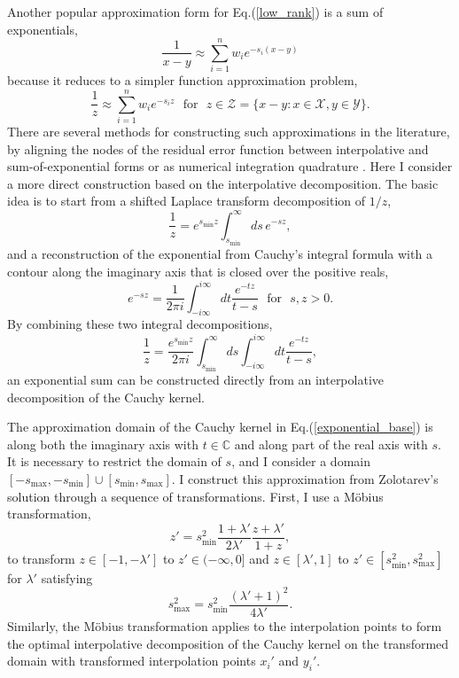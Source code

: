 \documentclass[12pt]{article}
\begin{document}
Another popular approximation form for Eq.\@ (\ref{low_rank}) is a sum of exponentials,
\begin{equation} \label{exponential_sum}
 \frac{1}{x-y} \approx \sum_{i=1}^n w_i e^{-s_i (x-y)}
\end{equation}
 because it reduces to a simpler function approximation problem,
\begin{equation} \label{exponential_sum2}
 \frac{1}{z} \approx \sum_{i=1}^n w_i e^{-s_i z} \ \ \ \mathrm{for} \ \ \ z \in \mathcal{Z} = \{ x - y : x \in \mathcal{X}, y \in \mathcal{Y} \}.
\end{equation}
There are several methods for constructing such approximations in the literature,
 by aligning the nodes of the residual error function between interpolative and sum-of-exponential forms \cite{10.1093/imanum/dri015}
 or as numerical integration quadrature \cite{BEYLKIN2010131}.
Here I consider a more direct construction based on the interpolative decomposition.
The basic idea is to start from a shifted Laplace transform decomposition of $1/z$,
\begin{equation}
 \frac{1}{z} = e^{s_{\min}z}\int_{s_{\min}}^{\infty} ds \, e^{-sz},
\end{equation}
 and a reconstruction of the exponential from Cauchy's integral formula with a contour along the imaginary axis that is closed over the positive reals,
\begin{equation}
 e^{-sz} = \frac{1}{2 \pi i} \int_{-i\infty}^{i\infty} dt \frac{e^{-tz}}{t - s} \ \ \ \mathrm{for} \ \ \ s, z >0.
\end{equation}
By combining these two integral decompositions,
\begin{equation} \label{exponential_base}
 \frac{1}{z} = \frac{e^{s_{\min}z}}{2 \pi i} \int_{s_{\min}}^{\infty} ds \int_{-i\infty}^{i\infty} dt \frac{e^{-tz}}{t - s},
\end{equation}
 an exponential sum can be constructed directly from an interpolative decomposition of the Cauchy kernel.

The approximation domain of the Cauchy kernel in Eq.\@ (\ref{exponential_base}) is along both the imaginary axis with $t \in \mathbb{C}$ and along part of the real axis with $s$.
It is necessary to restrict the domain of $s$, and I consider a domain $[-s_{\max}, -s_{\min}] \cup [s_{\min}, s_{\max}]$.
I construct this approximation from Zolotarev's solution through a sequence of transformations.
First, I use a M\"{o}bius transformation,
\begin{equation}
 z' = s_{\min}^2 \frac{1 + \lambda'}{2 \lambda'} \frac{z + \lambda'}{1+z},
\end{equation}
 to transform $z \in [-1, -\lambda']$ to $z' \in (-\infty,0]$ and $z \in [\lambda', 1]$ to $z' \in [s_{\min}^2, s_{\max}^2]$ for $\lambda'$ satisfying
\begin{equation}
 s_{\max}^2 = s_{\min}^2 \frac{(\lambda' +1)^2}{4 \lambda'}.
\end{equation}
Similarly, the M\"{o}bius transformation applies to the interpolation points to form the optimal interpolative decomposition of the Cauchy kernel on the transformed domain
 with transformed interpolation points $x_i'$ and $y_i'$.
\end{document}
